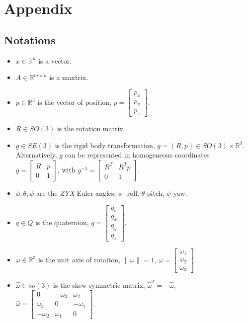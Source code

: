 \chapter*{Appendix}
\section*{Notations}
\begin{itemize}
\item $x \in \mathbb{R}^n$ is a vector.
\item $A \in \mathbb{R}^{m \times n}$  is a  maxtrix.
\item $p \in \mathbb{R}^3$ is the vector of position,
$ p = \begin{bmatrix}
p_x \\
p_y  \\
p_z
\end{bmatrix}.$
\item $R \in SO(3)$  is the rotation matrix.
\item $g \in SE(3)$ is the rigid body transformation, $g = (R, p) \in SO(3) \times \mathbb{R}^3$. \\
Alternatively, $g$ can be represented in homogeneous coordinates \\
$
g =
\begin{bmatrix}
 R &  p \\
0 & 1
 \end{bmatrix}
$,
with
$
g^{-1} =
\begin{bmatrix}
 R^T & R^T p \\
0 & 1
 \end{bmatrix}
$.


\item $\phi, \theta, \psi$ are the {\it ZYX} Euler angles, $\phi$- roll, $\theta$-pitch, $\psi$-yaw.

\item $q \in Q$  is the quaternion,
$ q = \begin{bmatrix}
q_s \\
q_x \\
q_y  \\
q_z
\end{bmatrix}$.

\item $\omega \in \mathbb{R}^3$ is the unit axis of rotaiton, $\|\omega\| = 1$,
$ \omega = \begin{bmatrix}
\omega_1 \\
\omega_2  \\
\omega_3
\end{bmatrix}.$

\item $\hat \omega \in so(3)$ is the skew-symmetric matrix, $ \hat \omega^T = - \hat \omega$,
$
\hat \omega =
\begin{bmatrix}
 0 & -\omega_3 & \omega_2 \\
\omega_3 & 0 & -\omega_1 \\
 -\omega_2 & \omega_1 & 0
 \end{bmatrix}
$.

\end{itemize}

%